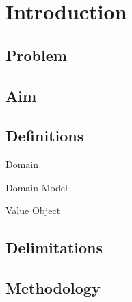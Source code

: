 \chapter{Introduction}

\section{Problem}
\section{Aim}
\section{Definitions}
\begin{definition}{Domain}
	
\end{definition}

\begin{definition}{Domain Model}
\end{definition}

\begin{definition}{Value Object}
\end{definition}

\section{Delimitations}
\section{Methodology}
